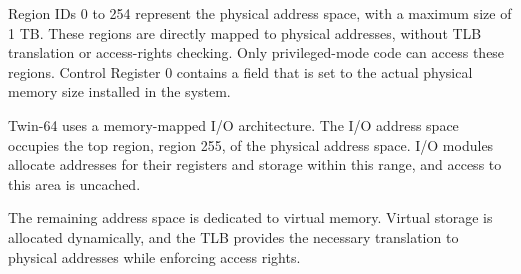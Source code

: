 Region IDs 0 to 254 represent the physical address space, with a maximum size of 1 TB. These regions are directly mapped to physical addresses, without TLB translation or access-rights checking. Only privileged-mode code can access these regions. Control Register 0 contains a field that is set to the actual physical memory size installed in the system.

Twin-64 uses a memory-mapped I/O architecture. The I/O address space occupies the top region, region 255, of the physical address space. I/O modules allocate addresses for their registers and storage within this range, and access to this area is uncached.

The remaining address space is dedicated to virtual memory. Virtual storage is allocated dynamically, and the TLB provides the necessary translation to physical addresses while enforcing access rights.
